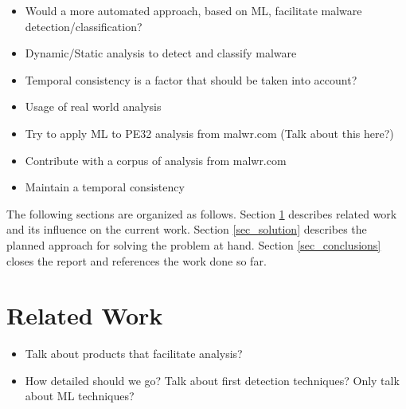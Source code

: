 \documentclass{llncs}
\begin{document}
\begin{itemize}
	\item Would a more automated approach, based on ML, facilitate malware detection/classification?
	\item Dynamic/Static analysis to detect and classify malware
	\item Temporal consistency is a factor that should be taken into account?
	
\end{itemize}
\begin{itemize}
	\item Usage of real world analysis
	\item Try to apply ML to PE32 analysis from malwr.com (Talk about this here?)
	\item Contribute with a corpus of analysis from malwr.com
	\item Maintain a temporal consistency
		
	
\end{itemize}
The following sections are organized as follows. Section \ref{sec_related_work} describes related work and its influence on the current work. Section \ref{sec_solution} describes the planned approach for solving the problem at hand. Section \ref{sec_conclusions} closes the report and references the work done so far.


\section{Related Work}\label{sec_related_work}

\begin{itemize}
	\item Talk about products that facilitate analysis?
	\item How detailed should we go? Talk about first detection techniques? Only talk about ML techniques?
\end{itemize}

% 

\end{document}
